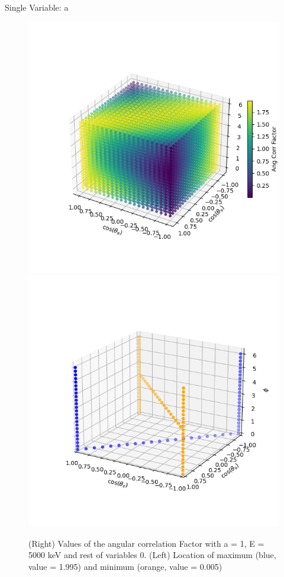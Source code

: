 \documentclass{beamer}
\begin{document}
\begin{frame}{Single Variable: a}
\begin{figure}
	\centering
	\includegraphics[width=0.4\paperwidth]{plots/a_3D_image.png}
	\includegraphics[width=0.4\paperwidth]{plots/a_max_min.png}
	\caption{(Right) Values of the angular correlation Factor with a = 1, E = 5000 keV and rest of variables 0. (Left) Location of maximum (blue, value = 1.995) and minimum (orange, value = 0.005)}	
\end{figure}
\end{frame}
\end{document}

